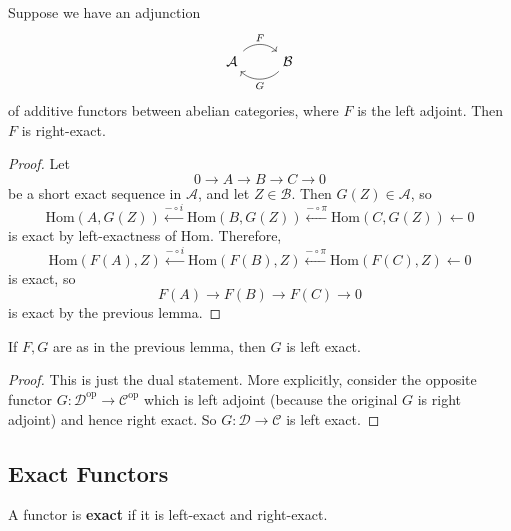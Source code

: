 \begin{lemma}
   Suppose we have an adjunction
   \[\begin{tikzcd}
	   {\mathcal{A}} & {\mathcal{B}}
	   \arrow["F", bend left=45, from=1-1, to=1-2]
	   \arrow["G", bend left=45, from=1-2, to=1-1]
   \end{tikzcd}\]
   of additive functors between abelian categories, where $ F $ is the left adjoint. Then $ F $ is right-exact.
\end{lemma}
\begin{proof}
    Let
    \begin{equation*}
    0 \to A \to B \to C \to 0
    \end{equation*}
    be a short exact sequence in $ \mathcal{A} $, and let $ Z \in \mathcal{B} $. Then $ G(Z) \in \mathcal{A} $, so
    \begin{equation*}
       \text{Hom}(A, G(Z)) \xleftarrow{- \circ i} \text{Hom}(B, G(Z)) \xleftarrow{- \circ \pi} \text{Hom}(C, G(Z)) \gets 0
    \end{equation*}
    is exact by left-exactness of Hom. Therefore,
    \begin{equation*}
       \text{Hom}(F(A), Z) \xleftarrow{- \circ i} \text{Hom}(F(B), Z) \xleftarrow{- \circ \pi} \text{Hom}(F(C), Z) \gets 0
    \end{equation*}
    is exact, so
    \begin{equation*}
    F(A) \to F(B) \to F(C) \to 0
    \end{equation*}
    is exact by the previous lemma.
\end{proof}

\begin{corollary}
    If $ F,G $ are as in the previous lemma, then $ G $ is left exact.
\end{corollary}
\begin{proof}
   This is just the dual statement. More explicitly, consider the opposite functor $ G: \mathcal{D}^{\text{op}} \to \mathcal{C}^{\text{op}} $ which is left adjoint (because the original $ G $ is right adjoint) and hence right exact. So
   $ G: \mathcal{D} \to \mathcal{C} $ is left exact.
\end{proof}

\subsection{Exact Functors} %
\label{sub:exact_functors}
\begin{definition}
   A functor is \textbf{exact} if it is left-exact and right-exact.
\end{definition}

